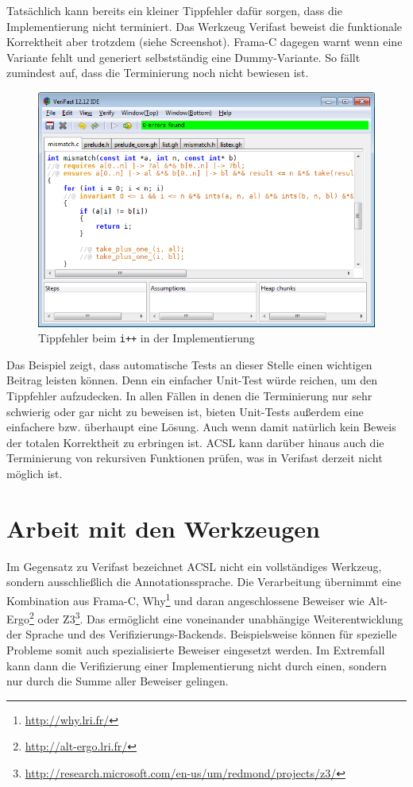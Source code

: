 Tatsächlich kann bereits ein kleiner Tippfehler dafür sorgen, dass die Implementierung
nicht terminiert. Das Werkzeug Verifast beweist die funktionale Korrektheit aber trotzdem
(siehe Screenshot). Frama-C dagegen warnt wenn eine Variante fehlt und generiert selbstständig
eine Dummy-Variante. So fällt zumindest auf, dass die Terminierung noch nicht bewiesen ist.

\begin{figure}[H]
	\centering
\includegraphics[width=1.0\textwidth]{images/verifast-partial-correctness.png}
\caption{Tippfehler beim \texttt{i++} in der Implementierung}
\end{figure}

Das Beispiel zeigt, dass automatische Tests an dieser Stelle einen wichtigen Beitrag leisten
können. Denn ein einfacher Unit-Test würde reichen, um den Tippfehler aufzudecken. In allen
Fällen in denen die Terminierung nur sehr schwierig oder gar nicht zu beweisen ist, bieten
Unit-Tests außerdem eine einfachere bzw. überhaupt eine Lösung. Auch wenn damit natürlich
kein Beweis der totalen Korrektheit zu erbringen ist.
\newline
\newline
ACSL kann darüber hinaus auch die Terminierung von rekursiven Funktionen prüfen, was in
Verifast derzeit nicht möglich ist.


\section{Arbeit mit den Werkzeugen}

Im Gegensatz zu Verifast bezeichnet ACSL nicht ein vollständiges Werkzeug, sondern ausschließlich
die Annotationssprache. Die Verarbeitung übernimmt eine Kombination aus Frama-C, Why\footnote{
\url{http://why.lri.fr/}} und daran angeschlossene Beweiser wie Alt-Ergo\footnote{\url{http://alt-ergo.lri.fr/}}
oder Z3\footnote{\url{http://research.microsoft.com/en-us/um/redmond/projects/z3/}}. Das ermöglicht 
eine voneinander unabhängige Weiterentwicklung der Sprache und des Verifizierungs-Backends. Beispielsweise 
können für spezielle Probleme somit auch spezialisierte Beweiser eingesetzt werden. Im Extremfall kann
dann die Verifizierung einer Implementierung nicht durch einen, sondern nur durch die Summe aller
Beweiser gelingen.

